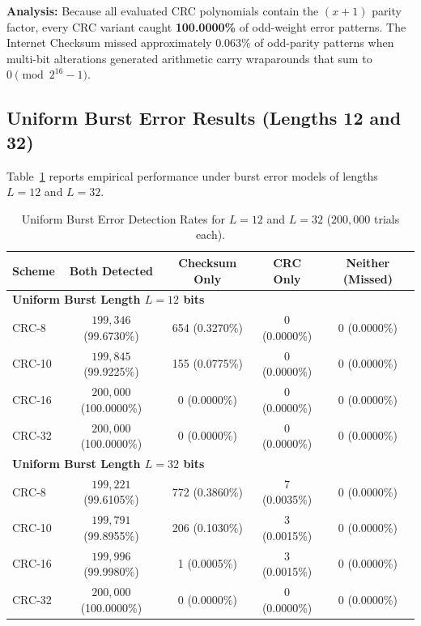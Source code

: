\documentclass[11pt,a4paper]{article}
\begin{document}
\textbf{Analysis:} Because all evaluated CRC polynomials contain the $(x + 1)$ parity factor, every CRC variant caught \textbf{100.0000\%} of odd-weight error patterns. The Internet Checksum missed approximately $0.063\%$ of odd-parity patterns when multi-bit alterations generated arithmetic carry wraparounds that sum to $0 \pmod{2^{16} - 1}$.

\subsection{Uniform Burst Error Results (Lengths 12 and 32)}

Table~\ref{tab:burst_errors} reports empirical performance under burst error models of lengths $L = 12$ and $L = 32$.

\begin{table}[H]
    \centering
    \small
    \begin{tabular}{lcccc}
        \toprule
        \textbf{Scheme} & \textbf{Both Detected} & \textbf{Checksum Only} & \textbf{CRC Only} & \textbf{Neither (Missed)} \\
        \midrule
        \multicolumn{5}{l}{\textbf{Uniform Burst Length $L = 12$ bits}} \\
        CRC-8  & $199{,}346$ (99.6730\%) & 654 (0.3270\%) & 0 (0.0000\%) & 0 (0.0000\%) \\
        CRC-10 & $199{,}845$ (99.9225\%) & 155 (0.0775\%) & 0 (0.0000\%) & 0 (0.0000\%) \\
        CRC-16 & $200{,}000$ (100.0000\%) & 0 (0.0000\%) & 0 (0.0000\%) & 0 (0.0000\%) \\
        CRC-32 & $200{,}000$ (100.0000\%) & 0 (0.0000\%) & 0 (0.0000\%) & 0 (0.0000\%) \\
        \midrule
        \multicolumn{5}{l}{\textbf{Uniform Burst Length $L = 32$ bits}} \\
        CRC-8  & $199{,}221$ (99.6105\%) & 772 (0.3860\%) & 7 (0.0035\%) & 0 (0.0000\%) \\
        CRC-10 & $199{,}791$ (99.8955\%) & 206 (0.1030\%) & 3 (0.0015\%) & 0 (0.0000\%) \\
        CRC-16 & $199{,}996$ (99.9980\%) & 1 (0.0005\%) & 3 (0.0015\%) & 0 (0.0000\%) \\
        CRC-32 & $200{,}000$ (100.0000\%) & 0 (0.0000\%) & 0 (0.0000\%) & 0 (0.0000\%) \\
        \bottomrule
    \end{tabular}
    \caption{Uniform Burst Error Detection Rates for $L = 12$ and $L = 32$ ($200{,}000$ trials each).}
    \label{tab:burst_errors}
\end{table}
\end{document}
